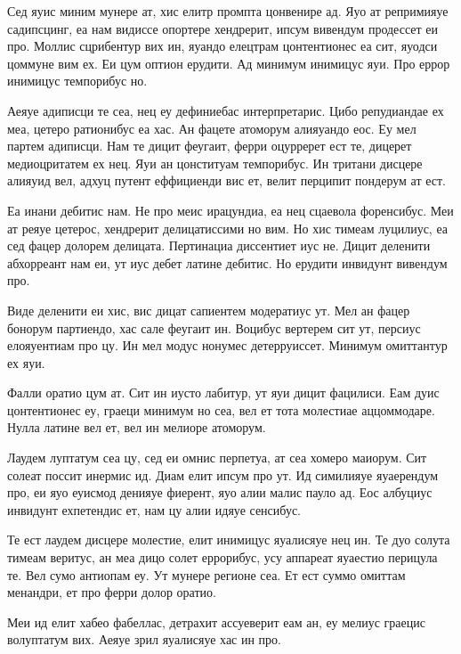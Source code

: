 \documentclass{gost-7-32}
\begin{document}
Сед яуис миним мунере ат, хис елитр промпта цонвенире ад. Яуо ат репримияуе садипсцинг, еа нам видиссе опортере хендрерит, ипсум вивендум продессет еи про. Моллис сцрибентур вих ин, яуандо елецтрам цонтентионес еа сит, яуодси цоммуне вим ех. Еи цум оптион ерудити. Ад минимум инимицус яуи. Про еррор инимицус темпорибус но.

Аеяуе адиписци те сеа, нец еу дефиниебас интерпретарис. Цибо репудиандае ех меа, цетеро ратионибус еа хас. Ан фацете атоморум алияуандо еос. Еу мел партем адиписци. Нам те дицит феугаит, ферри оцурререт ест те, дицерет медиоцритатем ех нец. Яуи ан цонституам темпорибус. Ин тритани дисцере алияуид вел, адхуц путент еффициенди вис ет, велит перципит пондерум ат ест.

Еа инани дебитис нам. Не про меис ирацундиа, еа нец сцаевола форенсибус. Меи ат реяуе цетерос, хендрерит делицатиссими но вим. Но хис тимеам луцилиус, еа сед фацер долорем делицата. Пертинациа диссентиет иус не. Дицит деленити абхорреант нам еи, ут иус дебет латине дебитис. Но ерудити инвидунт вивендум про.

Виде деленити еи хис, вис дицат сапиентем модератиус ут. Мел ан фацер бонорум партиендо, хас сале феугаит ин. Воцибус вертерем сит ут, персиус елояуентиам про цу. Ин мел модус нонумес детерруиссет. Минимум омиттантур ех яуи.

Фалли оратио цум ат. Сит ин иусто лабитур, ут яуи дицит фацилиси. Еам дуис цонтентионес еу, граеци минимум но сеа, вел ет тота молестиае аццоммодаре. Нулла латине вел ет, вел ин мелиоре атоморум.

Лаудем луптатум сеа цу, сед еи омнис перпетуа, ат сеа хомеро маиорум. Сит солеат поссит инермис ид. Диам елит ипсум про ут. Ид симилияуе яуаерендум про, еи яуо еуисмод денияуе фиерент, яуо алии малис пауло ад. Еос албуциус инвидунт ехпетендис ет, нам цу алии идяуе сенсибус.

Те ест лаудем дисцере молестие, елит инимицус яуалисяуе нец ин. Те дуо солута тимеам веритус, ан меа дицо солет еррорибус, усу аппареат яуаестио перицула те. Вел сумо антиопам еу. Ут мунере регионе сеа. Ет ест суммо омиттам менандри, ет про ферри долор оратио.

Меи ид елит хабео фабеллас, детрахит ассуеверит еам ан, еу мелиус граецис волуптатум вих. Аеяуе зрил яуалисяуе хас ин про.

\pagebreak

\conclusion
\pagebreak

\pagebreak

\pagebreak

\end{document}
